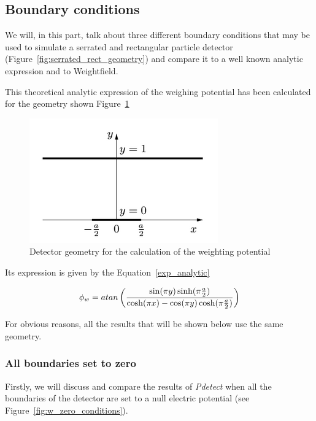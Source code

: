 \documentclass[11pt]{article}
\begin{document}
	\subsection{Boundary conditions}

		We will, in this part, talk about three different boundary conditions that may be used
		to simulate a serrated and rectangular particle detector
		(Figure~\ref{fig:serrated_rect_geometry}) and compare it to a well known analytic
		expression and to Weightfield.

		This theoretical analytic expression of the weighing potential has been calculated for
		the geometry shown Figure~\ref{fig:analytic}

		\begin{figure}[H]
			\center
			\includegraphics[scale=0.5]{images/boundary_conditions/detector/analytic.png}
			\caption{Detector geometry for the calculation of the weighting
				potential~\cite{pixeldetector}}
			\label{fig:analytic}
		\end{figure}

		Its expression is given by the Equation~\ref{exp_analytic}

		\begin{equation}
			\phi_w = atan\left({\sin(\pi y)\sinh(\pi {a\over{2}})\over
					{\cosh(\pi x)-\cos(\pi y)\cosh(\pi {a\over{2}})}}\right)
			\label{exp_analytic}
		\end{equation}

		For obvious reasons, all the results that will be shown below use the same geometry.

		\subsubsection{All boundaries set to zero}

			Firstly, we will discuss and compare the results of \textit{Pdetect} when all the
			boundaries of the detector are set to a null electric potential
			(see Figure~\ref{fig:w_zero_conditions}).
\end{document}
